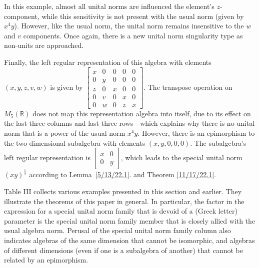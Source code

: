 \documentclass{amsart}
\numberwithin{equation}{section}
\theoremstyle{definition}
\numberwithin{theorem}{section}
\begin{document}
In this example, almost all unital norms are influenced the element's $z$-component, while this sensitivity is not present with the usual norm (given by $x^4y$).  However, like the usual norm,  the unital norm remains insensitive to the $w$ and $v$ components.  Once again, there is a new unital norm singularity type as non-units are approached.  

Finally, the left regular representation of this algebra with elements $(x,y,z,v,w)$ is given by $ \left[
\begin{array}{ccccc}
x & 0 & 0 & 0 & 0   \\
0 & y & 0 & 0 & 0 \\
z & 0 &  x & 0 & 0  \\
0 & v &  0 & x & 0  \\
0 & w &  0 & z & x
\end{array}
\right].$ 
The transpose operation on $M_5(\mathbb{R})$ does not map this representation algebra into itself, due to its effect on the last three columns and last three rows - which explains why there is no unital norm that is a power of the usual norm $x^4y$.  However, there is an epimorphism to the two-dimensional subalgebra with elements $(x,y,0,0,0)$.  The subalgebra's left regular representation is $\left[\begin{array}{ccc}
x & 0  \\
 0 & y  
\end{array} \right]$, which leads to the special unital norm $(xy)^\frac{1}{2}$ according to \mbox{Lemma \ref{5/13/22.1}}.  and Theorem \ref{11/17/22.1}.

\vspace{.5cm}

Table III collects various examples presented in this section and earlier.  They illustrate the theorems of this paper in general. 
In particular, the factor in the expression for a special unital norm family that is devoid of a (Greek letter) parameter is the special unital norm family member that is closely allied with the usual algebra norm.   Perusal of the special unital norm family column also indicates algebras of the same dimension that cannot be isomorphic, and algebras of different dimensions (even if one is a subalgebra of another) that cannot be related by an epimorphism.
\end{document}
